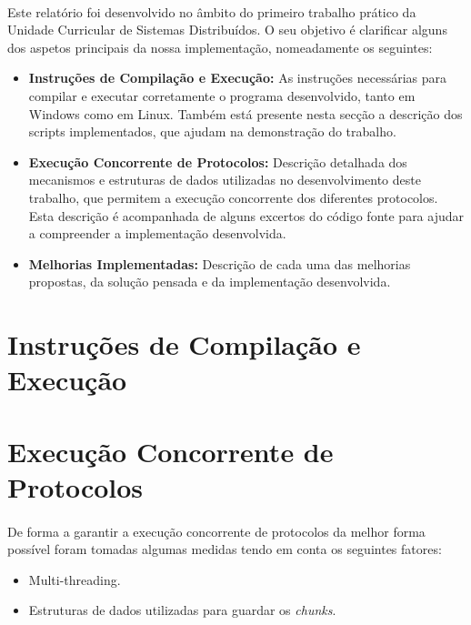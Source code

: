 \documentclass[11pt,oneside]{book}
\begin{document}
\paragraph{}
Este relatório foi desenvolvido no âmbito do primeiro trabalho prático da 
Unidade Curricular de Sistemas Distribuídos. O seu objetivo é clarificar 
alguns dos aspetos principais da nossa implementação, nomeadamente os seguintes:
\begin{itemize}
    \item \textbf{Instruções de Compilação e Execução:} As instruções necessárias
    para compilar e executar corretamente o programa desenvolvido, tanto em Windows
    como em Linux. Também está presente nesta secção a descrição dos scripts 
    implementados, que ajudam na demonstração do trabalho.
    \item \textbf{Execução Concorrente de Protocolos:} Descrição detalhada dos
    mecanismos e estruturas de dados utilizadas no desenvolvimento deste trabalho, 
    que permitem a execução concorrente dos diferentes protocolos. Esta descrição é
    acompanhada de alguns excertos do código fonte para ajudar a compreender a 
    implementação desenvolvida.
    \item \textbf{Melhorias Implementadas:} Descrição de cada uma das melhorias 
    propostas, da solução pensada e da implementação desenvolvida.
    
\end{itemize}     

\pagebreak

\section{Instruções de Compilação e Execução}
\paragraph{}

\pagebreak

\section{Execução Concorrente de Protocolos}
\paragraph{}
    De forma a garantir a execução concorrente de protocolos da melhor forma
    possível foram tomadas algumas medidas tendo em conta os seguintes fatores:
    \begin{itemize}
        \item   Multi-threading.
        \item  Estruturas de dados utilizadas para guardar os \textit{chunks}.
    \end{itemize}
\end{document}
